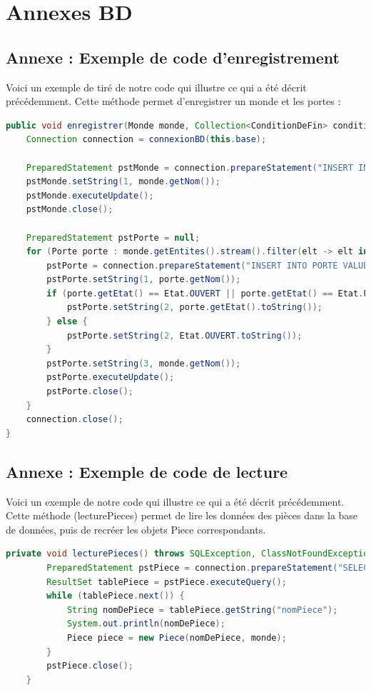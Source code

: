 \documentclass[a4paper, 12pt]{report}
\begin{document}
\appendix
\chapter{Annexes BD}
\section{Annexe : Exemple de code d'enregistrement}
\label{annexe:exemple-enregistrement}
Voici un exemple de tiré de notre code qui illustre ce qui a été décrit précédemment. Cette méthode permet d'enregistrer un monde et les portes :

\begin{lstlisting}[language=Java]
public void enregistrer(Monde monde, Collection<ConditionDeFin> conditionsDeFin) throws Throwable {
    Connection connection = connexionBD(this.base);

    PreparedStatement pstMonde = connection.prepareStatement("INSERT INTO MONDE VALUES (?)");
    pstMonde.setString(1, monde.getNom());
    pstMonde.executeUpdate();
    pstMonde.close();

    PreparedStatement pstPorte = null;
    for (Porte porte : monde.getEntites().stream().filter(elt -> elt instanceof Porte).map(elt -> (Porte) elt).toList()) {
        pstPorte = connection.prepareStatement("INSERT INTO PORTE VALUES (?, ?, ?)");
        pstPorte.setString(1, porte.getNom());
        if (porte.getEtat() == Etat.OUVERT || porte.getEtat() == Etat.FERME) {
            pstPorte.setString(2, porte.getEtat().toString());
        } else {
            pstPorte.setString(2, Etat.OUVERT.toString());
        }
        pstPorte.setString(3, monde.getNom());
        pstPorte.executeUpdate();
        pstPorte.close();
    }
	connection.close();
}
\end{lstlisting}

\section{Annexe : Exemple de code de lecture}
\label{annexe:exemple-lecture}

Voici un exemple de notre code qui illustre ce qui a été décrit précédemment. Cette méthode (lecturePieces) permet de lire les données des pièces dans la base de données, puis de recréer les objets Piece correspondants.

\begin{lstlisting}[language=Java]
    private void lecturePieces() throws SQLException, ClassNotFoundException, ITIAventureException {
        PreparedStatement pstPiece = connection.prepareStatement("SELECT * FROM PIECE");
        ResultSet tablePiece = pstPiece.executeQuery();
        while (tablePiece.next()) {           
            String nomDePiece = tablePiece.getString("nomPiece");
            System.out.println(nomDePiece);            
            Piece piece = new Piece(nomDePiece, monde);     
        }
        pstPiece.close();
    }
\end{lstlisting}
\end{document}

